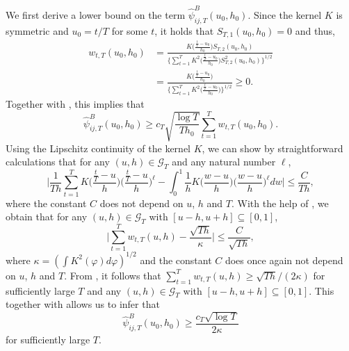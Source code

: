 \documentclass[12pt]{article}
\makeatletter
\renewcommand{\eqref}[1]{\tagform@{\ref{#1}}}
\makeatother
\begin{document}
We first derive a lower bound on the term $\widehat{\psi}_{ij, T}^B(u_0,h_0)$.  
Since the kernel $K$ is symmetric and $u_0 = t/T$ for some $t$, it holds that $S_{T,1}(u_0,h_0) = 0$ and thus,
\begin{align*} 
w_{t,T}(u_0,h_0) 
&= \frac{K\Big(\frac{\frac{t}{T}-u_0}{h_0}\Big) S_{T, 2}(u_0, h_0)}{\Big\{ \sum_{t=1}^T K^2\Big(\frac{\frac{t}{T}-u_0}{h_0}\Big)S^2_{T, 2}(u_0, h_0) \Big\}^{1/2}} \\
&=\frac{K\Big(\frac{\frac{t}{T}-u_0}{h_0}\Big)}{\Big\{ \sum_{t=1}^T K^2\Big(\frac{\frac{t}{T}-u_0}{h_0}\Big)\Big\}^{1/2}} \ge 0.
\end{align*}
Together with \eqref{eqA:power2}, this implies that 
\begin{equation}\label{eq1-proof-prop-test-power}
\widehat{\psi}_{ij, T}^B(u_0,h_0) \ge c_T \sqrt{\frac{\log T}{Th_0}} \sum\limits_{t=1}^T w_{t,T}(u_0,h_0).
\end{equation}
Using the Lipschitz continuity of the kernel $K$, we can show by straightforward calculations that for any $(u,h) \in \mathcal{G}_T$ and any natural number $\ell$, 
\begin{equation}\label{eq-riemann-sum}
\Big| \frac{1}{Th} \sum\limits_{t=1}^T K\Big(\frac{\frac{t}{T}-u}{h}\Big) \Big(\frac{\frac{t}{T}-u}{h}\Big)^\ell - \int_0^1 \frac{1}{h} K\Big(\frac{w-u}{h}\Big) \Big(\frac{w-u}{h}\Big)^\ell dw \Big| \le \frac{C}{Th}, 
\end{equation}
where the constant $C$ does not depend on $u$, $h$ and $T$. With the help of \eqref{eq-riemann-sum}, we obtain that for any $(u,h) \in \mathcal{G}_T$ with $[u-h,u+h] \subseteq [0,1]$, 
\begin{equation}\label{eq2-proof-prop-test-power}
\Big| \sum\limits_{t=1}^T w_{t,T}(u,h) - \frac{\sqrt{Th}}{\kappa} \Big| \le \frac{C}{\sqrt{Th}}, 
\end{equation}
where $\kappa = (\int K^2(\varphi)d\varphi)^{1/2}$ and the constant $C$ does once again not depend on $u$, $h$ and $T$. From \eqref{eq2-proof-prop-test-power}, it follows that $\sum\nolimits_{t=1}^T w_{t,T}(u,h) \ge \sqrt{Th} / (2\kappa)$ for sufficiently large $T$ and any $(u,h) \in \mathcal{G}_T$ with $[u-h,u+h] \subseteq [0,1]$. This together with \eqref{eq1-proof-prop-test-power} allows us to infer that 
\begin{equation}\label{eqA:power:psiB}
\widehat{\psi}_{ij, T}^B(u_0,h_0) \ge \frac{c_T \sqrt{\log T}}{2 \kappa} 
\end{equation}
for sufficiently large $T$. 
\end{document}
